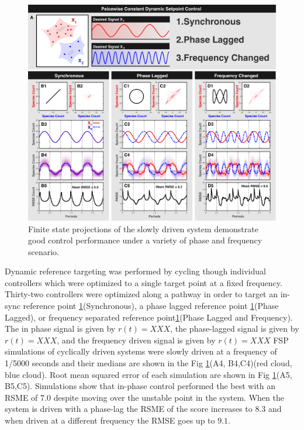 \documentclass[12pt]{article}
\begin{document}
\begin{figure}
\begin{center}
\includegraphics[width=1\textwidth]{DynamicControl.pdf}
\vspace{-0.1in}
\caption{Finite state projections of the slowly driven system demonstrate good control performance under a variety of phase and frequency scenario. }
\label{CR}
\end{center}
\vspace{-0.2in}
\end{figure}

Dynamic reference targeting was performed by cycling though individual controllers which were optimized to a single target point at a fixed frequency. Thirty-two controllers were optimized along a pathway in order to target an in-sync reference point \ref{CR}(Synchronous), a phase lagged reference point \ref{CR}(Phase Lagged), or frequency separated reference point\ref{CR}(Phase Lagged and Frequency). 
The in phase signal is given by $r(t)=XXX$, the phase-lagged signal is given by $r(t)=XXX$, and the frequency driven signal is given by $r(t)=XXX$ FSP simulations of cyclically driven systems were slowly driven at a frequency of 1/5000 seconds and their medians are shown in the Fig \ref{CR}(A4, B4,C4)(red cloud, blue cloud). Root mean squared error of each simulation are shown in Fig \ref{CR}(A5, B5,C5). Simulations show that in-phase control performed the best with an RSME of $7.0$ despite moving over the unstable point in the system. When the system is driven with a phase-lag the RSME of the score increases to $8.3$ and when driven at a different frequency the RMSE goes up to $9.1$. 
\end{document}

